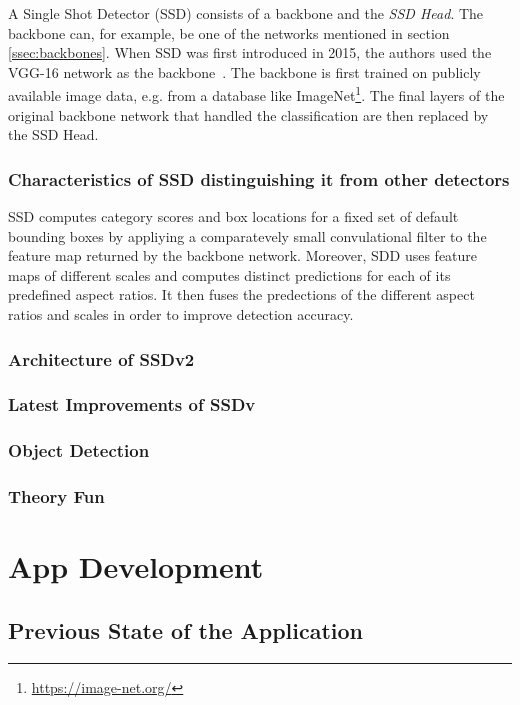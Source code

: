\documentclass[
			   fontsize=11pt,
               paper=a4,
               bibliography=totoc,
               idxtotoc,
               headsepline,
               footsepline,
               footinclude=false,
               BCOR=12mm,
               DIV=13,
               openany,   %
               ]
               {scrbook}
\begin{document}
A Single Shot Detector (SSD) consists of a backbone and the \textit{SSD Head}. The backbone can, for example, be one of the networks mentioned in section \ref{ssec:backbones}. When SSD was first introduced  in 2015, the authors used the VGG-16 network as the backbone~\cite{detectorSSD}. The backbone is first trained on publicly available image data, e.g. from a database like ImageNet\footnote{\url{https://image-net.org/}}. The final layers of the original backbone network that handled the classification are then replaced by the SSD Head.

\subsection{Characteristics of SSD distinguishing it from other detectors}

SSD computes category scores and box locations for a fixed set of default bounding boxes by appliying a comparatevely small convulational filter to the feature map returned by the backbone network. %
Moreover, SDD uses feature maps of different scales and computes distinct predictions for each of its predefined aspect ratios. It then fuses the predections of the different aspect ratios and scales in order to improve detection accuracy.


\subsection{Architecture of SSDv2}
\subsection{Latest Improvements of SSDv}
\subsection{Object Detection}
\subsection{Theory Fun}

\chapter{App Development}

\section{Previous State of the Application}
\end{document}
